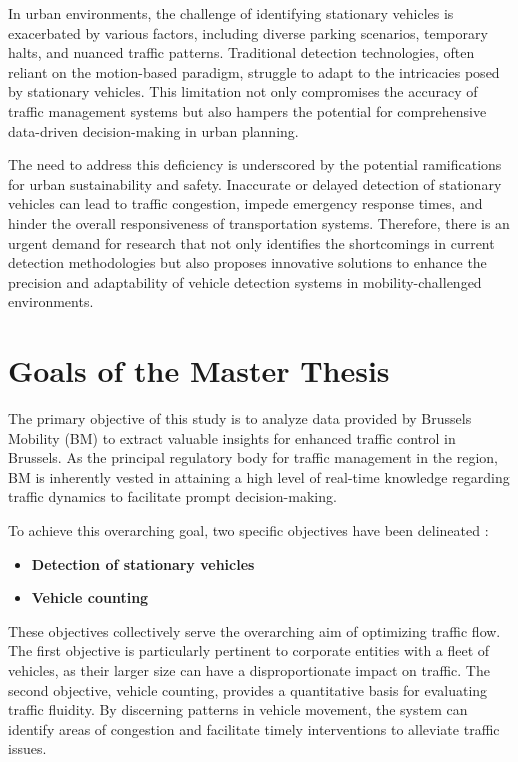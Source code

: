\documentclass[12pt]{report}
\begin{document}
	In urban environments, the challenge of identifying stationary vehicles is exacerbated by various factors, including diverse parking scenarios, temporary halts, and nuanced traffic patterns. Traditional detection technologies, often reliant on the motion-based paradigm, struggle to adapt to the intricacies posed by stationary vehicles. This limitation not only compromises the accuracy of traffic management systems but also hampers the potential for comprehensive data-driven decision-making in urban planning.
	
	The need to address this deficiency is underscored by the potential ramifications for urban sustainability and safety. Inaccurate or delayed detection of stationary vehicles can lead to traffic congestion, impede emergency response times, and hinder the overall responsiveness of transportation systems. Therefore, there is an urgent demand for research that not only identifies the shortcomings in current detection methodologies but also proposes innovative solutions to enhance the precision and adaptability of vehicle detection systems in mobility-challenged environments.
	
	\section{Goals of the Master Thesis}
	
	The primary objective of this study is to analyze data provided by Brussels Mobility (BM) to extract valuable insights for enhanced traffic control in Brussels. As the principal regulatory body for traffic management in the region, BM is inherently vested in attaining a high level of real-time knowledge regarding traffic dynamics to facilitate prompt decision-making.
	
	To achieve this overarching goal, two specific objectives have been delineated :
	\begin{itemize}
		\item \textbf{Detection of stationary vehicles}
		\item \textbf{Vehicle counting}
	\end{itemize} 
	
	These objectives collectively serve the overarching aim of optimizing traffic flow. The first objective is particularly pertinent to corporate entities with a fleet of vehicles, as their larger size can have a disproportionate impact on traffic. The second objective, vehicle counting, provides a quantitative basis for evaluating traffic fluidity. By discerning patterns in vehicle movement, the system can identify areas of congestion and facilitate timely interventions to alleviate traffic issues.
	
\end{document}

